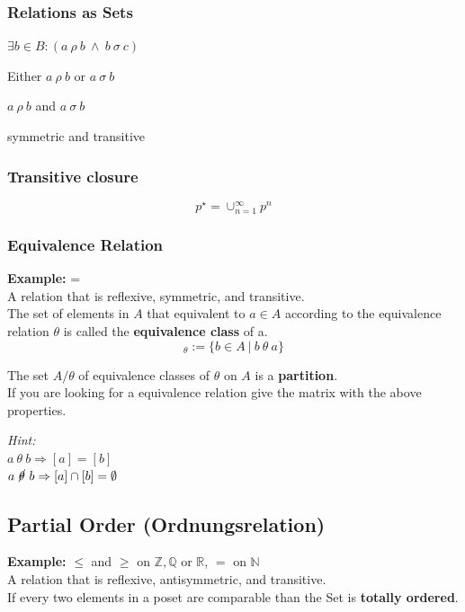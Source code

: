 \documentclass[11pt]{article}
\begin{document}
\subsubsection{Relations as Sets}

\begin{description}[labelindent=16pt,style=multiline,leftmargin=4.5cm, noitemsep]
	\item[$a\ \rho\sigma\ b$:] $\exists b\in B: (a\ \rho\ b\ \land\ b\ \sigma\ c)$
	\item[$a\ (\rho\cup\sigma)\ b$:] Either $a\ \rho\ b$ or $a\ \sigma\ b$
	\item[$a\ (\rho\cap\sigma)\ b$:] $a\ \rho\ b$ and $a\ \sigma\ b$
	\item[The empty set $\emptyset$:] symmetric and transitive
\end{description}
\subsubsection{Transitive closure}
\begin{equation}
	p^\star = \cup^\infty_{n=1}p^n
\end{equation}

\subsubsection{Equivalence Relation}
\textbf{Example:} = \\ 
A relation that is reflexive, symmetric, and transitive.\\

The set of elements in $A$ that equivalent to $a \in A$ according to the equivalence relation $\theta$ is called the \textbf{equivalence class} of a.
\begin{equation*}
	[a]_\theta := \{b \in A\ |\ b\ \theta\ a \}
\end{equation*}

The set $A/\theta$ of equivalence classes of $\theta$ on $A$ is a \textbf{partition}. \\
If you are looking for a equivalence relation give the matrix with the above properties.

\emph{Hint:}\\
$a\ \theta\ b \Rightarrow [a] = [b]$\\
$a\ \cancel{\theta}\ b \Rightarrow [a] \cap [b] = \emptyset$

\subsection{Partial Order (Ordnungsrelation)}
\textbf{Example:} $\leq$ and $\geq$ on $\mathbb{Z}, \mathbb{Q}$ or $\mathbb{R}$, $=$ on $\mathbb{N}$\\ 
A relation that is reflexive, antisymmetric, and transitive. \\
If every two elements in a poset are comparable than the Set is \textbf{totally ordered}.\\
\end{document}
